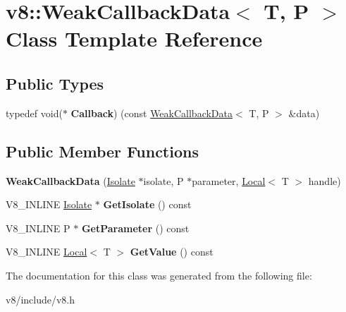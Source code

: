 \hypertarget{classv8_1_1WeakCallbackData}{}\section{v8\+:\+:Weak\+Callback\+Data$<$ T, P $>$ Class Template Reference}
\label{classv8_1_1WeakCallbackData}
\subsection*{Public Types}
\begin{DoxyCompactItemize}
\item 
typedef void($\ast$ {\bfseries Callback}) (const \hyperlink{classv8_1_1WeakCallbackData}{Weak\+Callback\+Data}$<$ T, P $>$ \&data)\hypertarget{classv8_1_1WeakCallbackData_a08a29122f54c663fc2442d8f42c08ac2}{}\label{classv8_1_1WeakCallbackData_a08a29122f54c663fc2442d8f42c08ac2}

\end{DoxyCompactItemize}
\subsection*{Public Member Functions}
\begin{DoxyCompactItemize}
\item 
{\bfseries Weak\+Callback\+Data} (\hyperlink{classv8_1_1Isolate}{Isolate} $\ast$isolate, P $\ast$parameter, \hyperlink{classv8_1_1Local}{Local}$<$ T $>$ handle)\hypertarget{classv8_1_1WeakCallbackData_a804314135aa731fcab6d57aafddd26d3}{}\label{classv8_1_1WeakCallbackData_a804314135aa731fcab6d57aafddd26d3}

\item 
V8\+\_\+\+I\+N\+L\+I\+NE \hyperlink{classv8_1_1Isolate}{Isolate} $\ast$ {\bfseries Get\+Isolate} () const \hypertarget{classv8_1_1WeakCallbackData_a499a971756182b5b52c28e506339c6b9}{}\label{classv8_1_1WeakCallbackData_a499a971756182b5b52c28e506339c6b9}

\item 
V8\+\_\+\+I\+N\+L\+I\+NE P $\ast$ {\bfseries Get\+Parameter} () const \hypertarget{classv8_1_1WeakCallbackData_a96ce7e1fbbfd56d0709225623517ff17}{}\label{classv8_1_1WeakCallbackData_a96ce7e1fbbfd56d0709225623517ff17}

\item 
V8\+\_\+\+I\+N\+L\+I\+NE \hyperlink{classv8_1_1Local}{Local}$<$ T $>$ {\bfseries Get\+Value} () const \hypertarget{classv8_1_1WeakCallbackData_a0e8fcf0091132c96d548ac319284710a}{}\label{classv8_1_1WeakCallbackData_a0e8fcf0091132c96d548ac319284710a}

\end{DoxyCompactItemize}


The documentation for this class was generated from the following file\+:\begin{DoxyCompactItemize}
\item 
v8/include/v8.\+h\end{DoxyCompactItemize}
